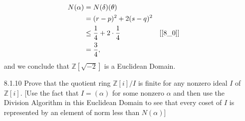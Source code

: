 \documentclass[9pt]{article}
\newcommand{\Z}{\mathbb{Z}}
\begin{document}
\begin{enumerate}
\begin{align*}
         N(\alpha) &= N(\delta)(\theta) \\
          &= (r - p)^2 + 2(s - q)^2 \\
          &\le \frac{1}{4} + 2 \cdot \frac{1}{4} &[\eqref{8_0}] \\
          &= \frac{3}{4},
      \end{align*}
      and we conclude that $\Z[\sqrt{-2}]$ is a Euclidean Domain.      
   \item[8.1.10]  Prove that the quotient ring $\Z[i]/I$ is finite for any
                  nonzero ideal $I$ of $\Z[i]$. [Use the fact that
                  $I = (\alpha)$ for some nonzero $\alpha$ and then use the
                  Division Algorithm in this Euclidean Domain to see that every
                  coset of $I$ is represented by an element of norm less than
                  $N(\alpha)$]


\end{enumerate}
\end{document}
